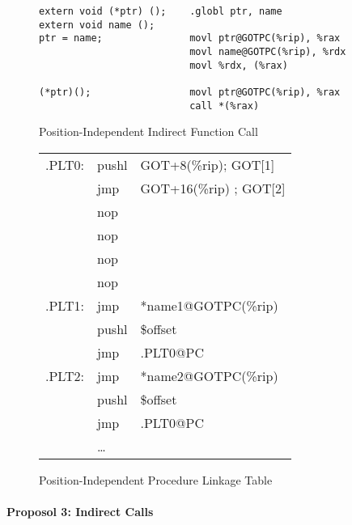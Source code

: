 \begin{figure}[H]
\caption{Position-Independent Indirect Function Call}
\begin{verbatim}
extern void (*ptr) ();    .globl ptr, name
extern void name ();
ptr = name;               movl ptr@GOTPC(%rip), %rax
                          movl name@GOTPC(%rip), %rdx
                          movl %rdx, (%rax)

(*ptr)();                 movl ptr@GOTPC(%rip), %rax
                          call *(%rax)
\end{verbatim}
\end{figure}

\begin{figure}[H]
\caption{Position-Independent Procedure Linkage Table}
\begin{tabular}{lll}
.PLT0: & pushl & GOT+8(\%rip); GOT[1]\\
& jmp &GOT+16(\%rip) ; GOT[2] \\
& nop & \\
& nop & \\
& nop & \\
& nop & \\
.PLT1: & jmp &*name1@GOTPC(\%rip)\\
& pushl & \$offset \\
&jmp &.PLT0@PC \\
.PLT2: & jmp&*name2@GOTPC(\%rip)\\
&pushl & \$offset \\
& jmp & .PLT0@PC \\
&\dots\\
\end{tabular}
\end{figure}


\paragraph{Proposol 3: Indirect Calls}



